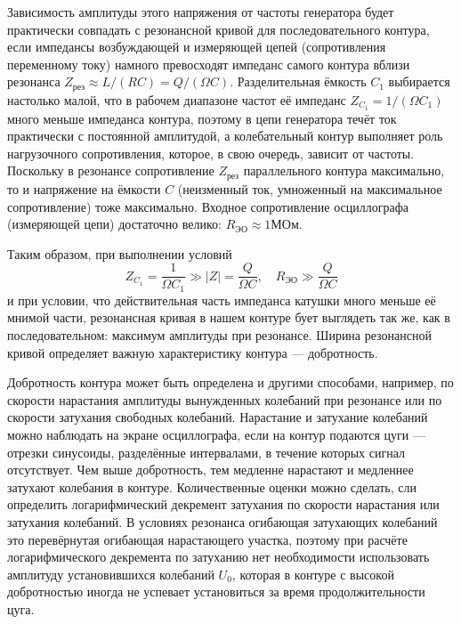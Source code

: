 \documentclass[a4paper, fontsize=14pt]{article}
\begin{document}
	Зависимость амплитуды этого напряжения от частоты генератора будет практически совпадать с резонансной кривой для последовательного контура, если импедансы возбуждающей и измеряющей цепей (сопротивления переменному току) намного превосходят импеданс самого контура вблизи резонанса $Z_\text{рез} \approx L / (RC) = Q / (\Omega C)$. Разделительная ёмкость $C_1$ выбирается настолько малой, что в рабочем диапазоне частот её импеданс $Z_{C_1} = 1/(\Omega C_1)$ много меньше импеданса контура, поэтому в цепи генератора течёт ток практически с постоянной амплитудой, а колебательный контур выполняет роль нагрузочного сопротивления, которое, в свою очередь, зависит от частоты. Поскольку в резонансе сопротивление $Z_\text{рез}$ параллельного контура максимально, то и напряжение на ёмкости $C$ (неизменный ток, умноженный на максимальное сопротивление) тоже максимально. Входное сопротивление осциллографа (измеряющей цепи) достаточно велико: $R_\text{ЭО} \approx 1 \text{МОм}$.
	
	Таким образом, при выполнении условий
	\[
		Z_{C_1} = \frac{1}{\Omega C_1} \gg |Z| = \frac{Q}{\Omega C}, \quad R_\text{ЭО} \gg \frac{Q}{\Omega C}
	\]
	и при условии, что действительная часть импеданса катушки много меньше её мнимой части, резонансная кривая в нашем контуре бует выглядеть так же, как в последовательном: максимум амплитуды при резонансе. Ширина резонансной кривой определяет важную характеристику контура --- добротность.
	
	Добротность контура может быть определена и другими способами, например, по скорости нарастания амплитуды вынужденных колебаний при резонансе или по скорости затухания свободных колебаний. Нарастание и затухание колебаний можно наблюдать на экране осциллографа, если на контур подаются цуги --- отрезки синусоиды, разделённые интервалами, в течение которых сигнал отсутствует. Чем выше добротность, тем медленне нарастают и медленнее затухают колебания в контуре. Количественные оценки можно сделать, сли определить логарифмический декремент затухания по скорости нарастания или затухания колебаний. В условиях резонанса огибающая затухающих колебаний это перевёрнутая огибающая нарастающего участка, поэтому при расчёте логарифмического декремента по затуханию нет необходимости использовать амплитуду установившихся колебаний $U_0$, которая в контуре с высокой добротностью иногда не успевает установиться за время продолжительности цуга.
\end{document}
